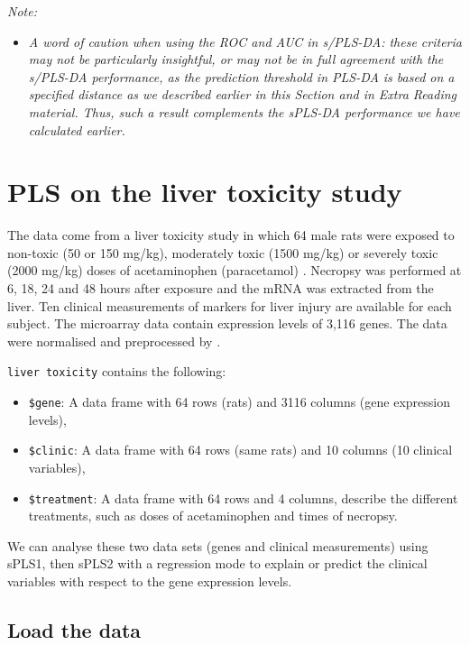 \documentclass[]{book}
\providecommand{\tightlist}{%
  \setlength{\itemsep}{0pt}\setlength{\parskip}{0pt}}
\begin{document}
\emph{Note:}

\begin{itemize}
\tightlist
\item
  \emph{A word of caution when using the ROC and AUC in s/PLS-DA: these criteria may not be particularly insightful, or may not be in full agreement with the s/PLS-DA performance, as the prediction threshold in PLS-DA is based on a specified distance as we described earlier in this Section and in Extra Reading material. Thus, such a result complements the sPLS-DA performance we have calculated earlier.}
\end{itemize}

\hypertarget{pls-liver-case}{%
\chapter{PLS on the liver toxicity study}\label{pls-liver-case}}

The data come from a liver toxicity study in which 64 male rats were exposed to non-toxic (50 or 150 mg/kg), moderately toxic (1500 mg/kg) or severely toxic (2000 mg/kg) doses of acetaminophen (paracetamol) \citep{Bus07}. Necropsy was performed at 6, 18, 24 and 48 hours after exposure and the mRNA was extracted from the liver. Ten clinical measurements of markers for liver injury are available for each subject. The microarray data contain expression levels of 3,116 genes. The data were normalised and preprocessed by \citet{Bus07}.

\texttt{liver\ toxicity} contains the following:

\begin{itemize}
\tightlist
\item
  \texttt{\$gene}: A data frame with 64 rows (rats) and 3116 columns (gene expression levels),
\item
  \texttt{\$clinic}: A data frame with 64 rows (same rats) and 10 columns (10 clinical variables),
\item
  \texttt{\$treatment}: A data frame with 64 rows and 4 columns, describe the different treatments, such as doses of acetaminophen and times of necropsy.
\end{itemize}

We can analyse these two data sets (genes and clinical measurements) using sPLS1, then sPLS2 with a regression mode to explain or predict the clinical variables with respect to the gene expression levels.

\hypertarget{pls:load}{%
\section{Load the data}\label{pls:load}}
\end{document}
